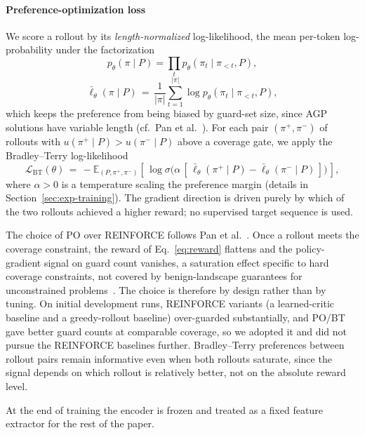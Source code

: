 \documentclass[11pt]{article}
\begin{document}
\paragraph{Preference-optimization loss} We score a rollout by its \emph{length-normalized} log-likelihood, the mean per-token log-probability under the factorization $$p_\theta(\pi \mid P) = \prod_t p_\theta(\pi_t \mid \pi_{<t}, P),$$
\begin{equation}
\bar{\ell}_\theta(\pi \mid P) \,=\, \frac{1}{|\pi|} \sum_{t=1}^{|\pi|} \log p_\theta(\pi_t \mid \pi_{<t}, P),
\label{eq:lognorm}
\end{equation}
which keeps the preference from being biased by guard-set size, since AGP solutions have variable length (cf.\ Pan et al.~\cite{Pan2025PO}). For each pair $(\pi^+, \pi^-)$ of rollouts with $u(\pi^+ \mid P) > u(\pi^- \mid P)$ above a coverage gate, we apply the Bradley--Terry log-likelihood
\begin{equation}
\mathcal{L}_{\mathrm{BT}}(\theta) \,=\, -\mathbb{E}_{(P, \pi^+, \pi^-)} \left[\, \log \sigma\!\big( \alpha\, [\, \bar{\ell}_\theta(\pi^+ \mid P) - \bar{\ell}_\theta(\pi^- \mid P)\, ] \big) \,\right],
\label{eq:bt-loss}
\end{equation}
where $\alpha > 0$ is a temperature scaling the preference margin (details in Section~\ref{sec:exp-training}). The gradient direction is driven purely by which of the two rollouts achieved a higher reward; no supervised target sequence is used.

The choice of PO over REINFORCE follows Pan et al.~\cite{Pan2025PO}. Once a rollout meets the coverage constraint, the reward of Eq.~\eqref{eq:reward} flattens and the policy-gradient signal on guard count vanishes, a saturation effect specific to hard coverage constraints, not covered by benign-landscape guarantees for unconstrained problems~\cite{Caramanis2023Landscape}. The choice is therefore by design rather than by tuning. On initial development runs, REINFORCE variants (a learned-critic baseline and a greedy-rollout baseline) over-guarded substantially, and PO/BT gave better guard counts at comparable coverage, so we adopted it and did not pursue the REINFORCE baselines further. Bradley--Terry preferences between rollout pairs remain informative even when both rollouts saturate, since the signal depends on which rollout is relatively better, not on the absolute reward level. 

At the end of training the encoder is frozen and treated as a fixed feature extractor for the rest of the paper.
\end{document}
